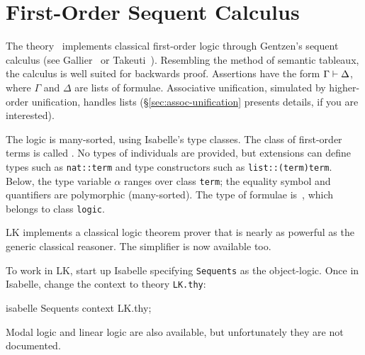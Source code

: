 \chapter{First-Order Sequent Calculus}

The theory~ implements classical first-order logic through Gentzen's
sequent calculus (see Gallier~\cite{gallier86} or Takeuti~\cite{takeuti87}).
Resembling the method of semantic tableaux, the calculus is well suited for
backwards proof.  Assertions have the form \(\Gamma\vdash \Delta\), where
\(\Gamma\) and \(\Delta\) are lists of formulae.  Associative unification,
simulated by higher-order unification, handles lists
(\S\ref{sec:assoc-unification} presents details, if you are interested).

The logic is many-sorted, using Isabelle's type classes.  The class of
first-order terms is called .  No types of individuals are
provided, but extensions can define types such as {\tt nat::term} and type
constructors such as {\tt list::(term)term}.  Below, the type variable
$\alpha$ ranges over class {\tt term}; the equality symbol and quantifiers
are polymorphic (many-sorted).  The type of formulae is~, which
belongs to class {\tt logic}.

LK implements a classical logic theorem prover that is nearly as powerful as
the generic classical reasoner.  The simplifier is now available too.

To work in LK, start up Isabelle specifying  \texttt{Sequents} as the
object-logic.  Once in Isabelle, change the context to theory \texttt{LK.thy}:
\begin{ttbox}
isabelle Sequents
context LK.thy;
\end{ttbox}
Modal logic and linear logic are also available, but unfortunately they are
not documented.


